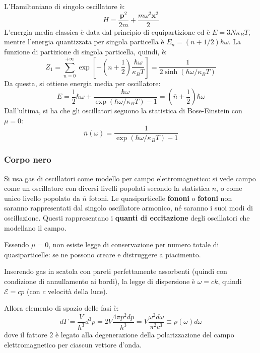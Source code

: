 \documentclass[10pt, a4paper]{scrartcl}
\numberwithin{equation}{subsection}
\theoremstyle{style1}
\theoremstyle{style2}
\begin{document}
L'Hamiltoniano di singolo oscillatore \`e:
\begin{equation}
	H = \frac{\mathbf{p} ^2}{2m} + \frac{m\omega ^2 \mathbf{x} ^2}{2}		
\end{equation}
L'energia media classica \`e data dal principio di equipartizione ed \`e $E = 3N\kappa _B T$, mentre l'energia quantizzata per singola particella \`e $E_n=(n+1 / 2) \hbar \omega$.
La funzione di partizione di singola particella, quindi, \`e:
\begin{equation}
	Z_1 = \sum_{n=0}^{+\infty} \exp \left[ - \left(n + \frac{1}{2}\right) \frac{\hbar \omega}{\kappa _B T} \right] = \frac{1}{2 \operatorname{sinh}(\hbar  \omega / \kappa _B T) }
\end{equation}
Da questa, si ottiene energia media per oscillatore:
\begin{equation}
	E = \frac{1}{2}\hbar  \omega + \frac{\hbar  \omega}{\exp(\hbar \omega / \kappa _B T) - 1} = \left(\overline{n} + \frac{1}{2}\right) \hbar \omega
\end{equation}
Dall'ultima, si ha che gli oscillatori seguono la statistica di Bose-Einstein con $\mu =0$:
\begin{equation}
	\overline{n}(\omega) = \frac{1}{\exp(\hbar \omega / \kappa _B T) - 1}
\end{equation}
\subsubsection{Corpo nero}
Si usa gas di oscillatori come modello per campo elettromagnetico: si vede campo come un oscillatore con diversi livelli popolati secondo la statistica $\overline{n}$, o come unico livello popolato da $\overline{n}$ fotoni.
Le quasiparticelle \textbf{fononi} o \textbf{fotoni} non saranno rappresentati dal singolo oscillatore armonico, n\'e saranno i suoi modi di oscillazione.
Questi rappresentano i \textbf{quanti di eccitazione} degli oscillatori che modellano il campo.

Essendo $\mu  =0 $, non esiste legge di conservazione per numero totale di quasiparticelle: se ne possono creare e distruggere a piacimento.

Inserendo gas in scatola con pareti perfettamente assorbenti (quindi con condizione di annullamento ai bordi), la legge di dispersione \`e $\omega = ck$, quindi $\mathscr{E} = cp$ (con $c$ velocit\`a della luce).

Allora elemento di spazio delle fasi \`e:
\begin{equation}
	d\Gamma= \frac{V}{h^3} d^3p  = 2V \frac{4 \pi p^2 dp}{h^3} = V \frac{\omega^2 d\omega }{\pi^2 c^3}\equiv \rho (\omega) d\omega
\end{equation}
dove il fattore $2$ \`e legato alla degenerazione della polarizzazione del campo elettromagnetico per ciascun vettore d'onda.
\end{document}
